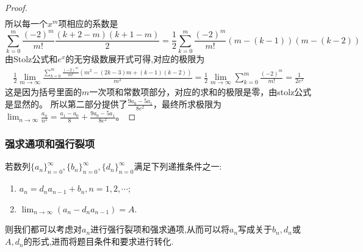 \documentclass[../../main.tex]{subfiles}
\begin{document}
\begin{proof}
\begin{align*}
\end{align*}
所以每一个\(x^m\)项相应的系数是
\[
\sum_{k = 0}^{m}\frac{(-2)^m}{m!}\frac{(k + 2 - m)(k + 1 - m)}{2}=\frac{1}{2}\sum_{k = 0}^{m}\frac{(-2)^m}{m!}(m - (k - 1))(m - (k - 2))
\]
由Stolz公式和$e^x$的无穷级数展开式可得,对应的极限为
\begin{align*}
\frac{1}{2}\lim_{m\rightarrow\infty}\frac{\sum\limits_{k = 0}^{m}\frac{(-2)^m}{m!}(m^2-(2k - 3)m+(k - 1)(k - 2))}{m^2}
=\frac{1}{2}\lim_{m\rightarrow\infty}\sum_{k = 0}^{m}\frac{(-2)^m}{m!}=\frac{1}{2e^2}
\end{align*}
这是因为括号里面的\(m\)一次项和常数项部分，对应的求和的极限是零，由stolz公式是显然的。
所以第二部分提供了\(\frac{9a_0 - 5a_1}{8e^2}\)，最终所求极限为\(\lim_{n\rightarrow\infty}\frac{a_n}{n^2}=\frac{a_1 - a_0}{8}+\frac{9a_0 - 5a_1}{8e^2}\)。

\end{proof}





\subsubsection{强求通项和强行裂项}

若数列\(\{ a_n \}_{n = 0}^{\infty}, \{ b_n \}_{n = 0}^{\infty}, \{ d_n \}_{n = 0}^{\infty}\)满足下列递推条件之一:
\begin{enumerate}
\item \(a_n = d_na_{n - 1} + b_n, n = 1, 2, \cdots\);
\item \(\lim_{n\rightarrow \infty}(a_n - d_na_{n - 1}) = A\).
\end{enumerate}
则我们都可以考虑对\(a_n\)进行强行裂项和强求通项,从而可以将\(a_n\)写成关于\(b_n, d_n\)或\(A, d_n\)的形式,进而将题目条件和要求进行转化.
\end{document}

